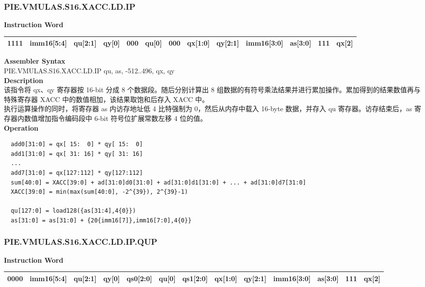 \newpage
\subsubsection{PIE.VMULAS.S16.XACC.LD.IP}\label{instruction:PIEVMULASS16XACCLDIP}
\setlength\tabcolsep{6pt}
\textbf{Instruction Word} \\
\begin{tabular}{|c|c|c|c|c|c|c|c|c|c|c|c|c|}
	\hline
	1111 & imm16[5:4] & qu[2:1] & qy[0] & 000 & qu[0] & 000 & qx[1:0] & qy[2:1] & imm16[3:0] & as[3:0] & 111 & qx[2] \\
	\hline
\end{tabular}

\textbf{Assembler Syntax} \\
PIE.VMULAS.S16.XACC.LD.IP qu, as, -512..496, qx, qy \\
\textbf{Description} \\
该指令将 qx、qy 寄存器按 16-bit 分成 8 个数据段。随后分别计算出 8 组数据的有符号乘法结果并进行累加操作。累加得到的结果数值再与特殊寄存器 XACC 中的数值相加，该结果取饱和后存入 XACC 中。\\ 执行运算操作的同时，将寄存器 as 内访存地址低 4 比特强制为 0，然后从内存中载入 16-byte 数据，并存入 qu 寄存器。访存结束后，as 寄存器内数值增加指令编码段中 6-bit 符号位扩展常数左移 4 位的值。\\
\textbf{Operation}
\begin{lstlisting}
  add0[31:0] = qx[ 15:  0] * qy[ 15:  0]
  add1[31:0] = qx[ 31: 16] * qy[ 31: 16]
  ...
  add7[31:0] = qx[127:112] * qy[127:112]
  sum[40:0] = XACC[39:0] + ad[31:0]d0[31:0] + ad[31:0]d1[31:0] + ... + ad[31:0]d7[31:0]
  XACC[39:0] = min(max(sum[40:0], -2^{39}), 2^{39}-1)

  qu[127:0] = load128({as[31:4],4{0}})
  as[31:0] = as[31:0] + {20{imm16[7]},imm16[7:0],4{0}}
\end{lstlisting}

\newpage
\subsubsection{PIE.VMULAS.S16.XACC.LD.IP.QUP}\label{instruction:PIEVMULASS16XACCLDIPQUP}
\setlength\tabcolsep{5pt}
\textbf{Instruction Word} \\
\begin{tabular}{|c|c|c|c|c|c|c|c|c|c|c|c|c|}
	\hline
	0000 & imm16[5:4] & qu[2:1] & qy[0] & qs0[2:0] & qu[0] & qs1[2:0] & qx[1:0] & qy[2:1] & imm16[3:0] & as[3:0] & 111 & qx[2] \\
	\hline
\end{tabular}

